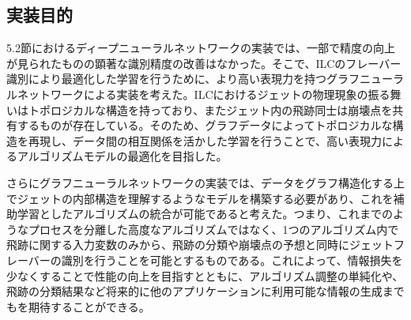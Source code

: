 \subsection{実装目的}
5.2節におけるディープニューラルネットワークの実装では、一部で精度の向上が見られたものの顕著な識別精度の改善はなかった。そこで、ILCのフレーバー識別により最適化した学習を行うために、より高い表現力を持つグラフニューラルネットワークによる実装を考えた。ILCにおけるジェットの物理現象の振る舞いはトポロジカルな構造を持っており、またジェット内の飛跡同士は崩壊点を共有するものが存在している。そのため、グラフデータによってトポロジカルな構造を再現し、データ間の相互関係を活かした学習を行うことで、高い表現力によるアルゴリズムモデルの最適化を目指した。

さらにグラフニューラルネットワークの実装では、データをグラフ構造化する上でジェットの内部構造を理解するようなモデルを構築する必要があり、これを補助学習としたアルゴリズムの統合が可能であると考えた。つまり、これまでのようなプロセスを分離した高度なアルゴリズムではなく、1つのアルゴリズム内で飛跡に関する入力変数のみから、飛跡の分類や崩壊点の予想と同時にジェットフレーバーの識別を行うことを可能とするものである。これによって、情報損失を少なくすることで性能の向上を目指すとともに、アルゴリズム調整の単純化や、飛跡の分類結果など将来的に他のアプリケーションに利用可能な情報の生成までもを期待することができる。
